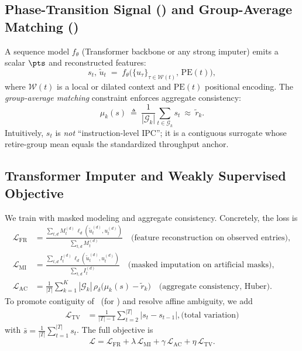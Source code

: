 \subsection{Phase-Transition Signal (\pts) and Group-Average Matching (\gam)}
A sequence model \(f_\theta\) (Transformer backbone or any strong imputer) emits a scalar \(\pts\) and reconstructed features:
\[
s_t,\,\tilde{u}_t \;=\; f_\theta\!\big(\{u_\tau\}_{\tau\in\mathcal{W}(t)},\,\mathrm{PE}(t)\big),
\]
where \(\mathcal{W}(t)\) is a local or dilated context and \(\mathrm{PE}(t)\) positional encoding. The \emph{group-average matching} constraint enforces aggregate consistency:
\begin{equation}
\mu_k(s)\ \triangleq\ \frac{1}{|\mathcal{G}_k|}\sum_{t\in\mathcal{G}_k}s_t\ \approx\ \tilde{r}_k.
\label{eq:group-avg}
\end{equation}
Intuitively, \(s_t\) is \emph{not} “instruction-level IPC”; it is a contiguous surrogate whose retire-group mean equals the standardized throughput anchor.
\subsection{Transformer Imputer and Weakly Supervised Objective}
We train with masked modeling and aggregate consistency. Concretely, the loss is
\begin{align}
\mathcal{L}_{\mathrm{FR}} &=\frac{\sum_{t,d}M_t^{(d)}\,\ell_d(\tilde{u}_t^{(d)},u_t^{(d)})}{\sum_{t,d}M_t^{(d)}}
\quad\text{(feature reconstruction on observed entries)}, \nonumber\\
\mathcal{L}_{\mathrm{MI}} &=\frac{\sum_{t,d}I_t^{(d)}\,\ell_d(\tilde{u}_t^{(d)},u_t^{(d)})}{\sum_{t,d}I_t^{(d)}}
\quad\text{(masked imputation on artificial masks)}, \nonumber\\
\mathcal{L}_{\mathrm{AC}} &= \frac{1}{|T|}\sum_{k=1}^K |\mathcal{G}_k|\,\rho_\delta\!\big(\mu_k(s)-\tilde{r}_k\big)
\quad\text{(aggregate consistency, Huber)}. \label{eq:ac}
\end{align}
To promote contiguity of \pts\ (for \cpd) and resolve affine ambiguity, we add 
\begin{align}
\mathcal{L}_{\mathrm{TV}} &= \frac{1}{|T|-1}\sum_{t=2}^{|T|} |s_t-s_{t-1}|, \text{(total\ variation)}
\end{align}
with \(\bar{s}=\tfrac{1}{|T|}\sum_{t=1}^{|T|} s_t\).
The full objective is
\begin{equation}
\mathcal{L} =\mathcal{L}_{\mathrm{FR}} + \lambda\,\mathcal{L}_{\mathrm{MI}} + \gamma\,\mathcal{L}_{\mathrm{AC}} +  \eta\,\mathcal{L}_{\mathrm{TV}}. \label{eq:full}
\end{equation}
